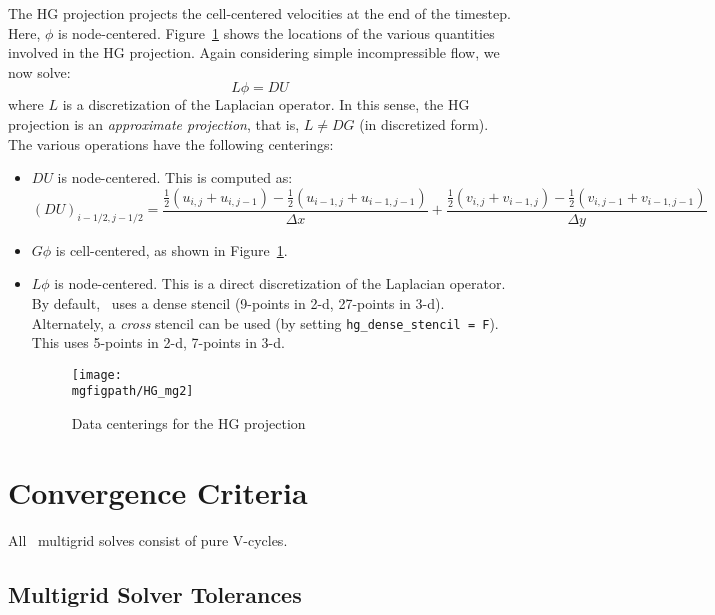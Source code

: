 The HG projection projects the cell-centered velocities at the end of
the timestep.  Here, $\phi$ is node-centered.  Figure~\ref{fig:mg:HG}
shows the locations of the various quantities involved in the HG
projection.  Again considering simple incompressible flow, we now
solve:
\begin{equation}
L \phi = D U
\end{equation}
where $L$ is a discretization of the Laplacian operator.  In this
sense, the HG projection is an {\em approximate projection}, that is,
$L \neq DG$ (in discretized form).  The various operations have the
following centerings:
\begin{itemize}

\item $DU$ is node-centered.  This is computed as:
  \begin{equation}
  (DU)_{i-1/2,j-1/2} = \frac{\frac{1}{2} (u_{i,j} + u_{i,j-1}) -
                             \frac{1}{2} (u_{i-1,j} + u_{i-1,j-1})}{\Delta x} +
                       \frac{\frac{1}{2} (v_{i,j} + v_{i-1,j}) -
                             \frac{1}{2} (v_{i,j-1} + v_{i-1,j-1})}{\Delta y} 
  \end{equation}

\item $G\phi$ is cell-centered, as shown in Figure~\ref{fig:mg:HG}.

\item $L\phi$ is node-centered.  This is a direct discretization of 
the Laplacian operator.  By default, \maestro\ uses a dense stencil
(9-points in 2-d, 27-points in 3-d).  Alternately, a {\em cross}
stencil can be used (by setting {\tt hg\_dense\_stencil = F}).  This
uses 5-points in 2-d, 7-points in 3-d.


\begin{figure}[t]
\centering
\texttt{[image: \\mgfigpath/HG\_mg2]}
\caption{\label{fig:mg:HG} Data centerings for the HG projection}
\end{figure}


\end{itemize}





\section{Convergence Criteria}

All \maestro\ multigrid solves consist of pure V-cycles.  


\subsection{Multigrid Solver Tolerances}

